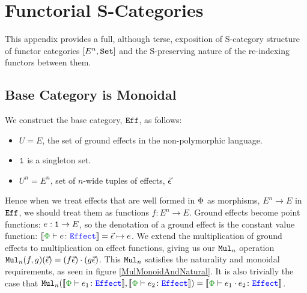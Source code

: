 
    \chapter{Functorial S-Categories}
    This appendix provides a full, although terse, exposition of S-category structure of functor categories $[E^n, \set]$ and the S-preserving nature of the re-indexing functors between them.
    
    \section{Base Category is Monoidal}
    
    We construct the base category, $\Eff$, as follows:
    
    \begin{itemize}
        \item $U = E$, the set of ground effects in the non-polymorphic language.
        \item $\1$ is a singleton set.
        \item $U^n = E^n$, set of $n$-wide tuples of effects, $\vec{\e}$
    \end{itemize}
    
    Hence when we treat effects that are well formed in $\P$ as morphisms, $E^n \rightarrow E$ in $\Eff$, we should treat them as functions $f: E^n \rightarrow E$. Ground effects become point functions: $e: \1 \rightarrow E$, so the denotation of a ground effect is the constant value function: $\deno{\typerelation{\P}{e}{\effect}} = \ev \mapsto e$. We extend the multiplication of ground effects to multiplication on effect functions, giving us our $\Mul_n$ operation $\Mul_n(f, g)(\ev) = (f\ev)\dot(g\ev)$. This $\Mul_n$ satisfies the naturality and monoidal requirements, as seen in figure \ref{MulMonoidAndNatural}. It is also trivially the case that $\Mul_n(\deno{\typerelation{\P}{e_1}{\effect}}, \deno{\typerelation{\P}{e_2}{\effect}}) = \deno{\typerelation{\P}{e_1\dot e_2}{\effect}}$.
    
